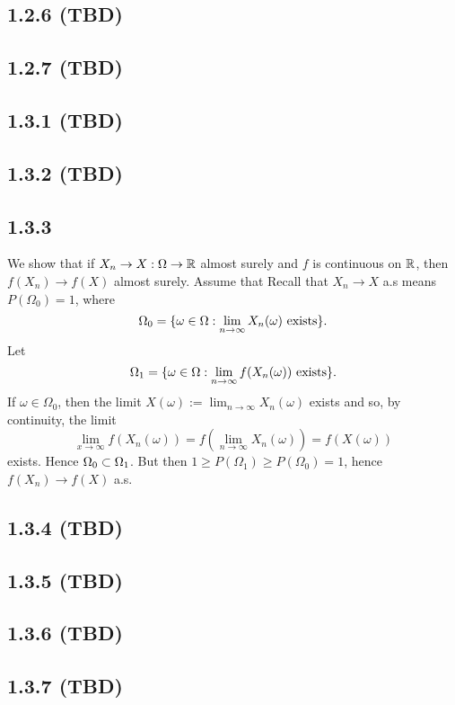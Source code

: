 \documentclass[11pt]{article}
\begin{document}
\subsection*{1.2.6 (TBD)}

\subsection*{1.2.7 (TBD)}

\subsection*{1.3.1 (TBD)}

\subsection*{1.3.2 (TBD)}

\subsection*{1.3.3}

We show that if $X_n \to X : \Omega \to {\mathbb R}$ almost surely and $f$ is continuous on ${\mathbb R}$, then $f(X_n) \to f(X)$ almost surely. Assume that Recall that $X_n \to X$ a.s means $P(\Omega_0) = 1$, where \[\Omega_0 = \{\omega \in \Omega: \lim_{n\to \infty} X_n(\omega) \text{ exists}\}.\] Let \[\Omega_1 =  \{\omega \in \Omega: \lim_{n\to \infty} f(X_n(\omega)) \text{ exists}\}.\] If $\omega \in \Omega_0$, then the limit $X(\omega) := \lim_{n\to \infty} X_n(\omega)$ exists and so, by continuity, the limit \[\lim_{x\to \infty } f(X_n(\omega)) = f(\lim_{n\to \infty} X_n(\omega)) = f(X(\omega))\] exists. Hence $\Omega_0 \subset \Omega_1$. But then $1 \geq P(\Omega_1) \geq P(\Omega_0) = 1$, hence $f(X_n) \to f(X)$ a.s.

\subsection*{1.3.4 (TBD)}

\subsection*{1.3.5 (TBD)}

\subsection*{1.3.6 (TBD)}

\subsection*{1.3.7 (TBD)}
\end{document}
